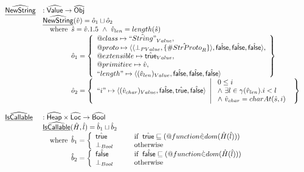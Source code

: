 \documentclass{article}
\makeatletter
\newcommand{\SF}[1]{\mbox{\textsf{#1}}}
\newcommand{\wherec}[1]{{\rm where}\begin{array}[t]{l}#1\end{array}}
\newcommand{\ifc}[1]{{\rm if}\begin{array}[t]{l}#1\end{array}}
\newcommand{\owc}{{\rm otherwise}}
\newcommand{\abs}[1]{\widehat{\SF{#1}}}
\newcommand{\aHeap}{\abs{Heap}}
\newcommand{\aLoc}{\abs{Loc}}
\newcommand{\aObj}{\abs{Obj}}
\newcommand{\set}[1]{\left\{\begin{array}{l}#1\end{array}\right\}}
\newcommand{\ahf}[1]{\widehat{\underline{\sf #1}}}
\newcommand{\varprop}[1]{@#1}
\newcommand{\avarloc}[1]{\hat{\##1}}
\newcommand{\atrue}{\hat{\SF{true}}}
\newcommand{\afalse}{\hat{\SF{false}}}
\makeatother
\begin{document}
\[\begin{array}{ll}
\ahf{NewString} & : \abs{Value} \rightarrow \aObj \\
& \ahf{NewString}(\hat{v}) = \hat{o}_1 \sqcup \hat{o}_2 \\
& \quad\wherec{
  \hat{s} = \hat{v}.1.5\ \land\ \hat{v}_{len} = length(\hat{s})\\
  \hat{o}_1 = \set{
    \varprop{class}\mapsto \hat{``String"}_{Value},\\
    \varprop{proto}\mapsto 
    \langle\langle\bot_{PValue},\{\avarloc{StrProto}_R\}\rangle,\afalse,\afalse,\afalse\rangle,\\
    \varprop{extensible}\mapsto \atrue_{Value}, \\
    \varprop{primitive}\mapsto \hat{v}, \\
    ``length"\mapsto \langle (\hat{v}_{len})_{Value}, \afalse, \afalse, \afalse\rangle \\
  } \\
  \hat{o}_2 = \set{``i"\mapsto \langle (\hat{v}_{char})_{Value}, \afalse, \atrue, \afalse\rangle ~\left|~
      \begin{array}{l}
        0 \leq i\\
        \land\ \exists l\in\gamma(\hat{v}_{len}).i < l\\
        \land\ \hat{v}_{char} = charAt(\hat{s},i)
      \end{array}
    \right.}
}\\
\\

\ahf{IsCallable} & : \aHeap \times \aLoc \rightarrow \abs{Bool} \\
& \ahf{IsCallable}(\hat{H},\hat{l})
  = \hat{b}_1\sqcup\hat{b}_2 \\
& \quad\wherec{
  \hat{b}_1 = 
    \left\{
      \begin{array}{l@{\quad\quad\quad}l}
        \atrue &\ifc{\atrue\sqsubseteq(\varprop{function} \dot{\in} dom(\hat{H}(\hat{l})))}\\
        \bot_{Bool} &\owc
      \end{array}
    \right.\\
  \hat{b}_2 = 
    \left\{
      \begin{array}{l@{\quad\quad\quad}l}
        \afalse &\ifc{\afalse\sqsubseteq(\varprop{function} \dot{\in} dom(\hat{H}(\hat{l})))}\\
        \bot_{Bool} &\owc
      \end{array}
    \right.\\
  }\\\\
\\


\end{array}\]
\end{document}

